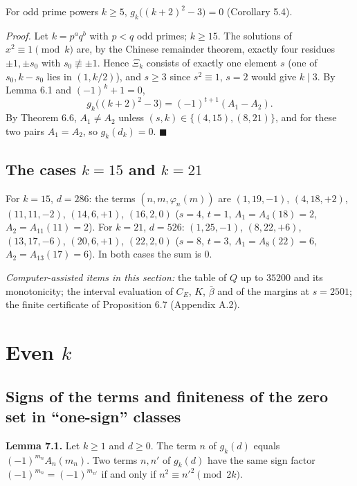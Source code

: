 For odd prime powers \(k\ge5\), \(g_k\bigl((k+2)^2-3\bigr)=0\) (Corollary 5.4).

\emph{Proof.} Let \(k=p^aq^b\) with \(p<q\) odd primes; \(k\ge15\). The solutions of \(x^2\equiv1\pmod k\) are, by the Chinese remainder theorem, exactly four residues \(\pm1,\pm s_0\) with \(s_0\not\equiv\pm1\). Hence \(\Xi_k\) consists of exactly one element \(s\) (one of \(s_0,k-s_0\) lies in \((1,k/2)\)), and \(s\ge3\) since \(s^2\equiv1\), \(s=2\) would give \(k\mid3\). By Lemma 6.1 and \((-1)^k+1=0\),
\[g_k\bigl((k+2)^2-3\bigr)=(-1)^{t+1}(A_1-A_2).\]
By Theorem 6.6, \(A_1\ne A_2\) unless \((s,k)\in\{(4,15),(8,21)\}\), and for these two pairs \(A_1=A_2\), so \(g_k(d_k)=0\). \(\blacksquare\)

\subsection{\texorpdfstring{The cases \(k=15\) and \(k=21\)}{The cases k=15 and k=21}}\label{the-cases-k15-and-k21}

For \(k=15\), \(d=286\): the terms \((n,m,\varphi_n(m))\) are \((1,19,-1)\), \((4,18,+2)\), \((11,11,-2)\), \((14,6,+1)\), \((16,2,0)\) (\(s=4\), \(t=1\), \(A_1=A_4(18)=2\), \(A_2=A_{11}(11)=2\)). For \(k=21\), \(d=526\): \((1,25,-1)\), \((8,22,+6)\), \((13,17,-6)\), \((20,6,+1)\), \((22,2,0)\) (\(s=8\), \(t=3\), \(A_1=A_8(22)=6\), \(A_2=A_{13}(17)=6\)). In both cases the sum is \(0\).

\emph{Computer-assisted items in this section:} the table of \(Q\) up to \(35200\) and its monotonicity; the interval evaluation of \(C_E\), \(K\), \(\bar\beta\) and of the margins at \(s=2501\); the finite certificate of Proposition 6.7 (Appendix A.2).

\section{\texorpdfstring{Even \(k\)}{Even k}}\label{even-k}

\subsection{Signs of the terms and finiteness of the zero set in ``one-sign'' classes}\label{signs-of-the-terms-and-finiteness-of-the-zero-set-in-one-sign-classes}

\textbf{Lemma 7.1.} Let \(k\ge1\) and \(d\ge0\). The term \(n\) of \(g_k(d)\) equals \((-1)^{m_n}A_n(m_n)\). Two terms \(n,n'\) of \(g_k(d)\) have the same sign factor \((-1)^{m_n}=(-1)^{m_{n'}}\) if and only if \(n^2\equiv n'^2\pmod{2k}\).

